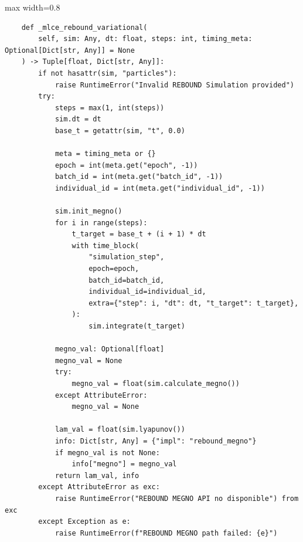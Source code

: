 \begin{listing}[H]
\caption{Bloque de código de \texttt{\_mlce\_rebound\_variacional}}
\begin{adjustbox}{max width=0.8\textwidth}
\begin{minipage}{\textwidth}
\begin{verbatim}
    def _mlce_rebound_variational(
        self, sim: Any, dt: float, steps: int, timing_meta: Optional[Dict[str, Any]] = None
    ) -> Tuple[float, Dict[str, Any]]:
        if not hasattr(sim, "particles"):
            raise RuntimeError("Invalid REBOUND Simulation provided")
        try:
            steps = max(1, int(steps))
            sim.dt = dt
            base_t = getattr(sim, "t", 0.0)

            meta = timing_meta or {}
            epoch = int(meta.get("epoch", -1))
            batch_id = int(meta.get("batch_id", -1))
            individual_id = int(meta.get("individual_id", -1))

            sim.init_megno()
            for i in range(steps):
                t_target = base_t + (i + 1) * dt
                with time_block(
                    "simulation_step",
                    epoch=epoch,
                    batch_id=batch_id,
                    individual_id=individual_id,
                    extra={"step": i, "dt": dt, "t_target": t_target},
                ):
                    sim.integrate(t_target)

            megno_val: Optional[float]
            megno_val = None
            try:
                megno_val = float(sim.calculate_megno())
            except AttributeError:
                megno_val = None

            lam_val = float(sim.lyapunov())
            info: Dict[str, Any] = {"impl": "rebound_megno"}
            if megno_val is not None:
                info["megno"] = megno_val
            return lam_val, info
        except AttributeError as exc:
            raise RuntimeError("REBOUND MEGNO API no disponible") from exc
        except Exception as e:
            raise RuntimeError(f"REBOUND MEGNO path failed: {e}")
\end{verbatim}
\end{minipage}
\end{adjustbox}
\end{listing}
\vspace{0.2cm}

